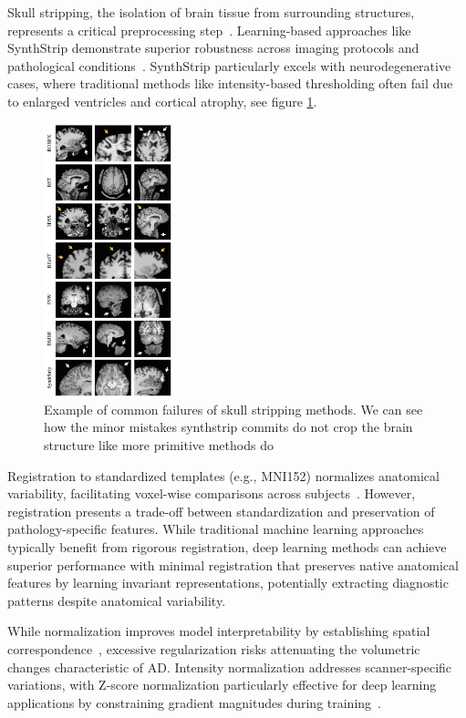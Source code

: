 \documentclass[12pt, a4paper]{article}
\begin{document}
Skull stripping, the isolation of brain tissue from surrounding structures, represents a critical preprocessing step~\cite{fatima2020state}. Learning-based approaches like SynthStrip demonstrate superior robustness across imaging protocols and pathological conditions~\cite{hoopes2022synthstrip}. SynthStrip particularly excels with neurodegenerative cases, where traditional methods like intensity-based thresholding often fail due to enlarged ventricles and cortical atrophy, see figure \ref{fig:skull_stripping}.

\begin{figure}[htbp]
  \centering
  \includegraphics[width=0.33\textwidth]{figures/ss_fails.png}
  \caption{Example of common failures of skull stripping methods. We can see how the minor mistakes synthstrip commits do not crop the brain structure like more primitive methods do~\cite{hoopes2022synthstrip}}
  \label{fig:skull_stripping}
\end{figure}

Registration to standardized templates (e.g., MNI152) normalizes anatomical variability, facilitating voxel-wise comparisons across subjects~\cite{garg2023review}. However, registration presents a trade-off between standardization and preservation of pathology-specific features. While traditional machine learning approaches typically benefit from rigorous registration, deep learning methods can achieve superior performance with minimal registration that preserves native anatomical features by learning invariant representations, potentially extracting diagnostic patterns despite anatomical variability.

While normalization improves model interpretability by establishing spatial correspondence~\cite{viswan2025enhancing}, excessive regularization risks attenuating the volumetric changes characteristic of AD. Intensity normalization addresses scanner-specific variations, with Z-score normalization particularly effective for deep learning applications by constraining gradient magnitudes during training~\cite{viswan2025enhancing}.
\end{document}
